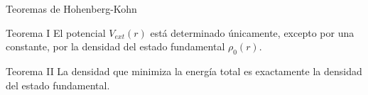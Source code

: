 \begin{frame}{Teoremas de Hohenberg-Kohn}
    \begin{block}{Teorema I}
        El potencial $V_{ext}(r)$ est\'a determinado \'unicamente, excepto por 
        una constante, por la densidad del estado fundamental $\rho _{0}(r)$.
    \end{block}

    \begin{block}{Teorema II}
    La densidad que minimiza la energ\'ia total es exactamente la densidad del 
    estado fundamental.
    \end{block}
\end{frame}